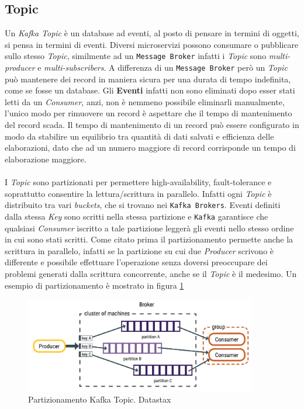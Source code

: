 \subsection{Topic}
\label{subsec:kafka_topics}
Un \textit{Kafka Topic} è un database ad eventi, al posto di pensare in termini di oggetti, si pensa in termini di eventi.
Diversi microservizi possono consumare o pubblicare sullo stesso \textit{Topic}, similmente ad un \texttt{Message Broker} infatti i \textit{Topic} sono \textit{multi-producer} e \textit{multi-subscribers}.
A differenza di un \texttt{Message Broker} però un \textit{Topic} può mantenere dei record in maniera sicura per una durata di tempo indefinita, come se fosse un database.
Gli \textbf{Eventi} infatti non sono eliminati dopo esser stati letti da un \textit{Consumer}, anzi, non è nemmeno possibile eliminarli manualmente, l'unico modo per rimuovere un record è aspettare che il tempo di mantenimento del record scada.
Il tempo di mantenimento di un record può essere configurato in modo da stabilire un equilibrio tra quantità di dati salvati e efficienza delle elaborazioni, dato che ad un numero maggiore di record corrisponde un tempo di elaborazione maggiore.\\\\
I \textit{Topic} sono partizionati per permettere high-availability, fault-tolerance e soprattutto consentire la lettura/scrittura in parallelo.
Infatti ogni \textit{Topic} è distribuito tra vari \textit{buckets}, che si trovano nei \texttt{Kafka Brokers}.
Eventi definiti dalla stessa \textit{Key} sono scritti nella stessa partizione e \texttt{Kafka} garantisce che qualsiasi \textit{Consumer} iscritto a tale partizione leggerà gli eventi nello stesso ordine in cui sono stati scritti.
Come citato prima il partizionamento permette anche la scrittura in parallelo, infatti se la partizione su cui due \textit{Producer} scrivono è differente e possibile effettuare l'operazione senza doversi preoccupare dei problemi generati dalla scrittura concorrente, anche se il \textit{Topic} è il medesimo.
Un esempio di partizionamento è mostrato in figura \ref{fig:kafka_topic}
\begin{figure}[htbp]
    \centering
    \includegraphics[width=0.9\textwidth]{images/kafka/topic.png}
    \caption{Partizionamento Kafka Topic. Datastax \cite{kafkaDatastax}}
    \label{fig:kafka_topic}
\end{figure}

